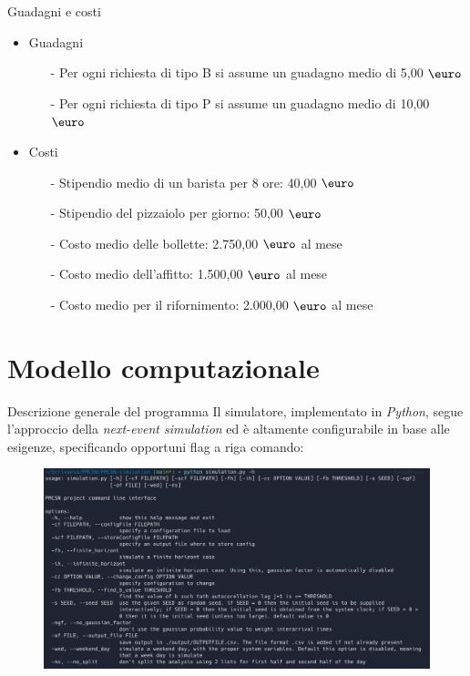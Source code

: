 \documentclass[xcolor=table]{beamer}
\newcommand{\eur}[1]{$\mbox{\euro}$}
\begin{document}
\begin{frame}{Guadagni e costi}\justifying
\begin{itemize}
\item Guadagni
\begin{itemize}
\item[-] Per ogni richiesta di tipo B si assume un guadagno medio di 5,00 $\mbox{\euro}$

\item[-] Per ogni richiesta di tipo P si assume un guadagno medio di 10,00 $\mbox{\euro}$
\end{itemize}

\item Costi
\begin{itemize}
\item[-] Stipendio medio di un barista per 8 ore: 40,00 $\mbox{\euro}$
\item[-] Stipendio del pizzaiolo per giorno: 50,00 $\mbox{\euro}$
\item[-] Costo medio delle bollette: 2.750,00 \eur{} al mese
\item[-] Costo medio dell'affitto: 1.500,00 \eur{} al mese
\item[-] Costo medio per il rifornimento: 2.000,00 \eur{} al mese
\end{itemize}
\end{itemize}
\end{frame}


\section{Modello computazionale}

\begin{frame}{Descrizione generale del programma}\justifying
Il simulatore, implementato in \textit{Python}, segue l'approccio della \textit{next-event simulation} ed è altamente configurabile in base alle esigenze, specificando opportuni flag a riga comando:

\begin{figure}[H]
\centering
\includegraphics[scale=0.2]{program_help}
\end{figure}
\end{frame}
\end{document}
